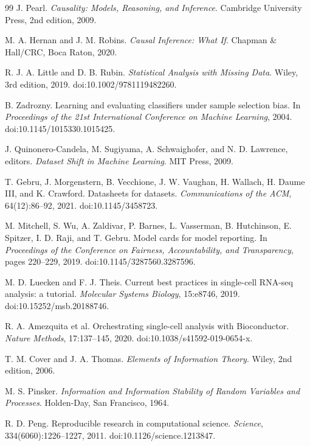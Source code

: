 \documentclass[11pt]{article}
\begin{document}
\begin{thebibliography}{99}
J. Pearl.
\newblock \emph{Causality: Models, Reasoning, and Inference}.
\newblock Cambridge University Press, 2nd edition, 2009.

M. A. Hernan and J. M. Robins.
\newblock \emph{Causal Inference: What If}.
\newblock Chapman \& Hall/CRC, Boca Raton, 2020.

R. J. A. Little and D. B. Rubin.
\newblock \emph{Statistical Analysis with Missing Data}.
\newblock Wiley, 3rd edition, 2019.
\newblock doi:10.1002/9781119482260.

B. Zadrozny.
\newblock Learning and evaluating classifiers under sample selection bias.
\newblock In \emph{Proceedings of the 21st International Conference on Machine Learning}, 2004.
\newblock doi:10.1145/1015330.1015425.

J. Quinonero-Candela, M. Sugiyama, A. Schwaighofer, and N. D. Lawrence, editors.
\newblock \emph{Dataset Shift in Machine Learning}.
\newblock MIT Press, 2009.

T. Gebru, J. Morgenstern, B. Vecchione, J. W. Vaughan, H. Wallach, H. Daume III, and K. Crawford.
\newblock Datasheets for datasets.
\newblock \emph{Communications of the ACM}, 64(12):86--92, 2021.
\newblock doi:10.1145/3458723.

M. Mitchell, S. Wu, A. Zaldivar, P. Barnes, L. Vasserman, B. Hutchinson, E. Spitzer, I. D. Raji, and T. Gebru.
\newblock Model cards for model reporting.
\newblock In \emph{Proceedings of the Conference on Fairness, Accountability, and Transparency}, pages 220--229, 2019.
\newblock doi:10.1145/3287560.3287596.

M. D. Luecken and F. J. Theis.
\newblock Current best practices in single-cell RNA-seq analysis: a tutorial.
\newblock \emph{Molecular Systems Biology}, 15:e8746, 2019.
\newblock doi:10.15252/msb.20188746.

R. A. Amezquita et al.
\newblock Orchestrating single-cell analysis with Bioconductor.
\newblock \emph{Nature Methods}, 17:137--145, 2020.
\newblock doi:10.1038/s41592-019-0654-x.

T. M. Cover and J. A. Thomas.
\newblock \emph{Elements of Information Theory}.
\newblock Wiley, 2nd edition, 2006.

M. S. Pinsker.
\newblock \emph{Information and Information Stability of Random Variables and Processes}.
\newblock Holden-Day, San Francisco, 1964.

R. D. Peng.
\newblock Reproducible research in computational science.
\newblock \emph{Science}, 334(6060):1226--1227, 2011.
\newblock doi:10.1126/science.1213847.

\end{thebibliography}
\end{document}
